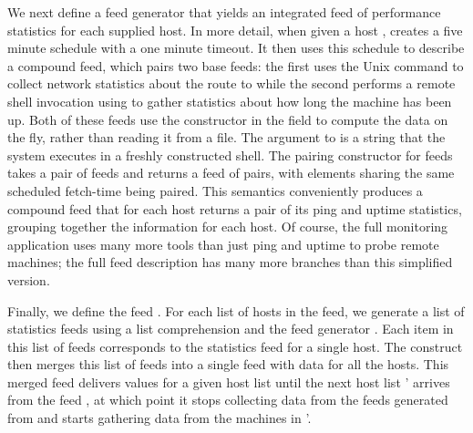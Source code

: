 We next define a feed generator  that yields an
integrated feed of performance statistics for each supplied host.  In
more detail, when given a host ,  creates a five
minute schedule with a one minute timeout. It then uses this schedule
to describe a compound feed, which pairs two base feeds: the first
uses the Unix command  to collect network statistics about
the route to  while the second performs a remote shell
invocation using  to gather statistics about how long the
machine has been up.  Both of these feeds use the 
constructor in the  field to compute the data on the fly,
rather than reading it from a file.  The argument to  is a
string that the system executes in a freshly constructed shell.  The
pairing constructor for feeds takes a pair of feeds and returns a feed
of pairs, with elements sharing the same scheduled fetch-time being
paired. This semantics conveniently produces a compound feed that for
each host returns a pair of its ping and uptime statistics, grouping
together the information for each host.  Of course, the full
\vizGems{} monitoring application uses many more tools than just ping
and uptime to probe remote machines; the full feed description has
many more branches than this simplified version. 

Finally, we define the feed .  For each list of hosts in the
 feed, we generate a list of statistics feeds using a
list comprehension and the feed generator .  Each item
in this list of feeds corresponds to the statistics feed for a single
host. The  construct then merges this list of
feeds into a single feed with data for all the hosts.  This merged
feed delivers values for a given host list  until the next host
list ' arrives from the feed , at which point
it stops collecting data from the feeds generated from  and
starts gathering data from the machines in '.



